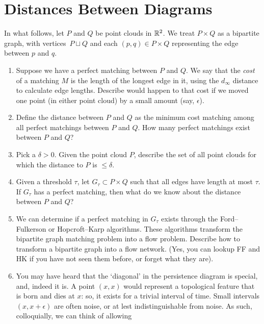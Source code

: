\documentclass{article}
\begin{document}
\pagebreak
\section*{Distances Between Diagrams}

In what follows, let $P$ and $Q$ be point clouds in ${\mathbb R}^2$.
We treat $P \times Q$ as a bipartite graph, with
vertices~$P \sqcup Q$ and each $(p,q) \in P \times Q$ representing the edge
between $p$ and $q$.

\begin{enumerate}[itemsep=2in]
    \item Suppose we have a perfect matching between $P$ and $Q$. We say
        that the \emph{cost} of a matching  $M$ is the length of the longest edge
        in it, using the $d_{\infty}$ distance to calculate edge lengths.
        Describe would happen to that cost if we moved one point (in either point
        cloud) by a small amount (say, $\epsilon$).
    \item Define the distance between $P$ and $Q$ as the minimum cost matching
        among all perfect matchings between $P$ and $Q$. How many perfect
        matchings exist between $P$ and $Q$?
    \item Pick a $\delta >0$. Given the point cloud $P$, describe the set of all
        point clouds for which the distance to $P$ is $\leq
        \delta$.
    \newpage
    \item Given a threshold $\tau$, let $G_{\tau} \subset P \times Q$ such that
        all edges have length at most $\tau$. If $G_{\tau}$ has a
        perfect matching, then what do we know about the distance between $P$
        and $Q$?
    \item We can determine if a perfect matching in $G_{\tau}$ exists through
        the Ford--Fulkerson or Hopcroft--Karp algorithms.  These algorithms
        transform the bipartite graph matching problem into a flow problem.
        Describe how to transform a bipartite graph into a flow network. (Yes,
        you can lookup FF and HK if you have not seen them before, or forget
        what they are).
    \item You may have heard that the `diagonal' in the persistence diagram is
        special, and, indeed it is.
        A point $(x,x)$ would represent a topological feature that is born and
        dies at $x$: so, it exists for a trivial interval of time. Small intervals
        $(x,x+\epsilon)$ are often noise, or at lest indistinguishable from
        noise. As such,
        colloquially, we can think of allowing

\end{enumerate}
\end{document}
